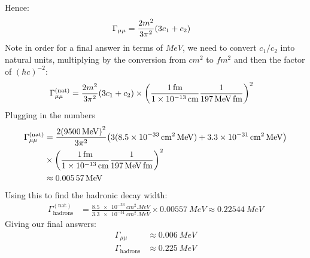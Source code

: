 \documentclass[12pt]{article}
\numberwithin{equation}{section}
\begin{document}
Hence:
\begin{align*}
  \Gamma_{\mu\mu}&=\frac{2m^2}{3\pi^2}\qty(3c_1+c_2)
\end{align*}
Note in order for a final answer in terms of $\unit{MeV}$, we need to convert $c_1/c_2$ into natural units, multiplying by the conversion from $\unit{cm^2}$ to $\unit{fm^2}$ and then the factor of ${(\hbar c)}^{-2}$:
\begin{align*}
  \Gamma_{\mu\mu}^{(\text{nat})}&=\frac{2m^2}{3\pi^2}\qty(3c_1+c_2)
  \times{\qty(\frac{\SI{1}{fm}}{\SI{1e-13}{cm}}\frac{1}{\SI{197}{MeV.fm}})}^2
\end{align*}
Plugging in the numbers
\begin{align*}
  \Gamma_{\mu\mu}^{(\text{nat})}&=
  \frac{2{(\SI{9500}{MeV})}^2}{3\pi^2}
  \qty(3(\SI{8.5e-33}{cm^2.MeV})+\SI{3.3e-31}{cm^2.MeV})\\
  &\times
  {\qty(\frac{\SI{1}{fm}}{\SI{1e-13}{cm}}\frac{1}{\SI{197}{MeV.fm}})}^2\\
  &\approx\SI{0.00557}{MeV}
\end{align*}
Using this to find the hadronic decay width:
\begin{align*}
  \Gamma_{\text{hadrons}}^{(\text{nat})}&=
  \frac{\SI{8.5e-33}{cm^2.MeV}}{\SI{3.3e-31}{cm^2.MeV}}\times\SI{0.00557}{MeV}
  \approx\SI{0.22544}{MeV}
\end{align*}
Giving our final answers:
\begin{equation}
  \label{eq:t2}
  \boxed{
    \begin{aligned}
      \Gamma_{\mu\mu}&\approx\SI{0.006}{MeV}\\
      \Gamma_{\text{hadrons}}&\approx\SI{0.225}{MeV}
    \end{aligned}
  }
\end{equation}
\newpage
\end{document}
